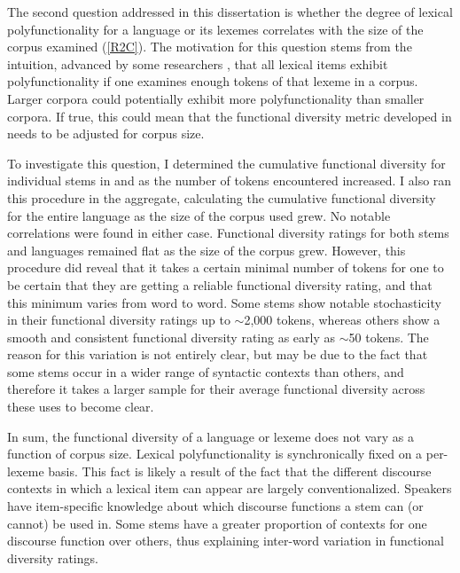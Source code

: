 The second question addressed in this dissertation is whether the degree of lexical polyfunctionality for a language or its lexemes correlates with the size of the corpus examined (\ref{R2C}). The motivation for this question stems from the intuition, advanced by some researchers \parencite{MoselHovdhaugen1992}, that all lexical items exhibit polyfunctionality if one examines enough tokens of that lexeme in a corpus. Larger corpora could potentially exhibit more polyfunctionality than smaller corpora. If true, this could mean that the functional diversity metric developed in  needs to be adjusted for corpus size.

To investigate this question, I determined the cumulative functional diversity for individual stems in  and  as the number of tokens encountered increased. I also ran this procedure in the aggregate, calculating the cumulative functional diversity for the entire language as the size of the corpus used grew. No notable correlations were found in either case. Functional diversity ratings for both stems and languages remained flat as the size of the corpus grew. However, this procedure did reveal that it takes a certain minimal number of tokens for one to be certain that they are getting a reliable functional diversity rating, and that this minimum varies from word to word. Some stems show notable stochasticity in their functional diversity ratings up to $\sim$2,000 tokens, whereas others show a smooth and consistent functional diversity rating as early as $\sim$50 tokens. The reason for this variation is not entirely clear, but may be due to the fact that some stems occur in a wider range of syntactic contexts than others, and therefore it takes a larger sample for their average functional diversity across these uses to become clear.

In sum, the functional diversity of a language or lexeme does not vary as a function of corpus size. Lexical polyfunctionality is synchronically fixed on a per-lexeme basis. This fact is likely a result of the fact that the different discourse contexts in which a lexical item can appear are largely conventionalized. Speakers have item-specific knowledge about which discourse functions a stem can (or cannot) be used in. Some stems have a greater proportion of contexts for one discourse function over others, thus explaining inter-word variation in functional diversity ratings.

